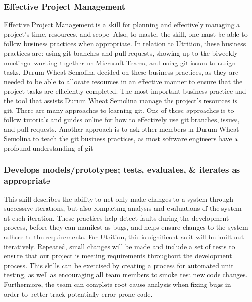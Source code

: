 \documentclass[12pt]{article}
\begin{document}
\subsubsection{Effective Project Management}
Effective Project Management is a skill for planning and effectively managing a project’s time, resources, and scope. Also, to master the skill, one must be able to follow business practices when appropriate. In relation to Utrition, these business practices are: using git branches and pull requests, showing up to the biweekly meetings, working together on Microsoft Teams, and using git issues to assign tasks. Durum Wheat Semolina decided on these business practices, as they are needed to be able to allocate resources in an effective manner to ensure that the project tasks are efficiently completed. The most important business practice and the tool that assists Durum Wheat Semolina manage the project’s resources is git. There are many approaches to learning git. One of these approaches is to follow tutorials and guides online for how to effectively use git branches, issues, and pull requests. Another approach is to ask other members in Durum Wheat Semolina to teach the git business practices, as most software engineers have a profound understanding of git.
\subsubsection{Develops models/prototypes; tests, evaluates, \& iterates as 
appropriate}
This skill describes the ability to not only make changes to a system through 
successive iterations, but also completing analysis and evaluations of the 
system at each iteration. These practices help detect faults during the 
development process, before they can manifest as bugs, and helps ensure changes 
to the system adhere to the requirements. For Utrition, this is significant as 
it will be built out iteratively. Repeated, small changes will be made and 
include a set of tests to ensure that our project is meeting requirements 
throughout the development process. This skills can be exercised by creating a 
process for automated unit testing, as well as encouraging all team members to 
smoke test new code changes. Furthermore, the team can complete root cause 
analysis when fixing bugs in order to better track potentially error-prone code.
\end{document}
